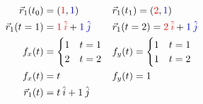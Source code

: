 \documentclass{article}
\begin{document}
\begin{equation*}
    \begin{aligned}
        \vec{r}_1(t_0) &= (\textcolor{red}{1}, \textcolor{blue}{1}) && \vec{r}_1(t_1) = (\textcolor{red}{2}, \textcolor{blue}{1}) \\
        \vec{r}_1(t=1) &= \textcolor{red}{1\:\hat{i}} + \textcolor{blue}{1\:\hat{j}} &&
        \vec{r}_1(t=2) = \textcolor{red}{2\:\hat{i}} + \textcolor{blue}{1\:\hat{j}} \\
        f_x(t) &= 
        \begin{cases}
            1 & t=1 \\
            2 & t=2
        \end{cases}
        &&
        f_y(t) = \begin{cases}
            1 & t=1 \\
            1 & t=2
        \end{cases} \\
        f_x(t) &= t && f_y(t) = 1 \\
        \vec{r}_1(t) &= t\:\hat{i} + 1\:\hat{j}
    \end{aligned}
\end{equation*}
\end{document}
